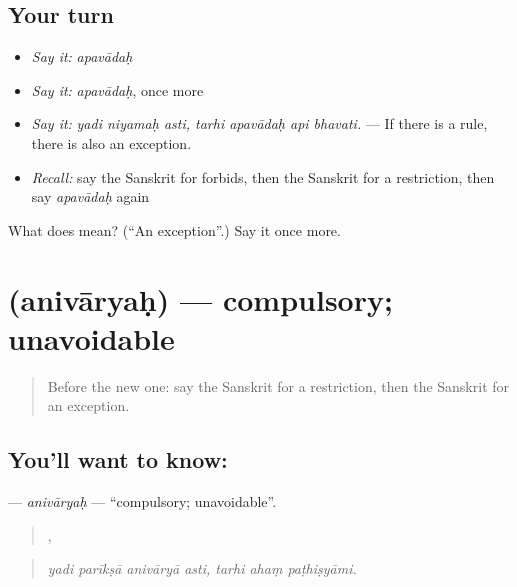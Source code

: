 \subsection*{Your turn}
\begin{itemize}
\raggedright
  \item \emph{Say it:} \emph{apavādaḥ}
  \item \emph{Say it:} \emph{apavādaḥ}, once more
  \item \emph{Say it:} \emph{yadi niyamaḥ asti, tarhi apavādaḥ api bhavati.} — If there is a rule, there is also an exception.
  \item \emph{Recall:} say the Sanskrit for forbids, then the Sanskrit for a restriction, then say \emph{apavādaḥ} again
\end{itemize}

\begin{tcolorbox}[breakable,colback=teal!4,colframe=teal!35!black,title={Before you move on}]
What does  mean? (\textquotedblleft{}An exception\textquotedblright{}.) Say it once more.
\end{tcolorbox}
\section[\texorpdfstring{\sk{अनिवार्यः} (anivāryaḥ)}{अनिवार्यः (anivāryaḥ)}]{ (anivāryaḥ) — compulsory; unavoidable}

\label{lesson:SA-C373-anivaryah}



\begin{quote}
Before the new one: say the Sanskrit for a restriction, then the Sanskrit for an exception.
\end{quote}

\subsection*{You'll want to know: }
\textbf{} — \emph{anivāryaḥ} — \textquotedblleft{}compulsory; unavoidable\textquotedblright{}.

\begin{quote}
   ,   
\end{quote}

\begin{quote}
\emph{yadi parīkṣā anivāryā asti, tarhi ahaṃ paṭhiṣyāmi.}
\end{quote}

